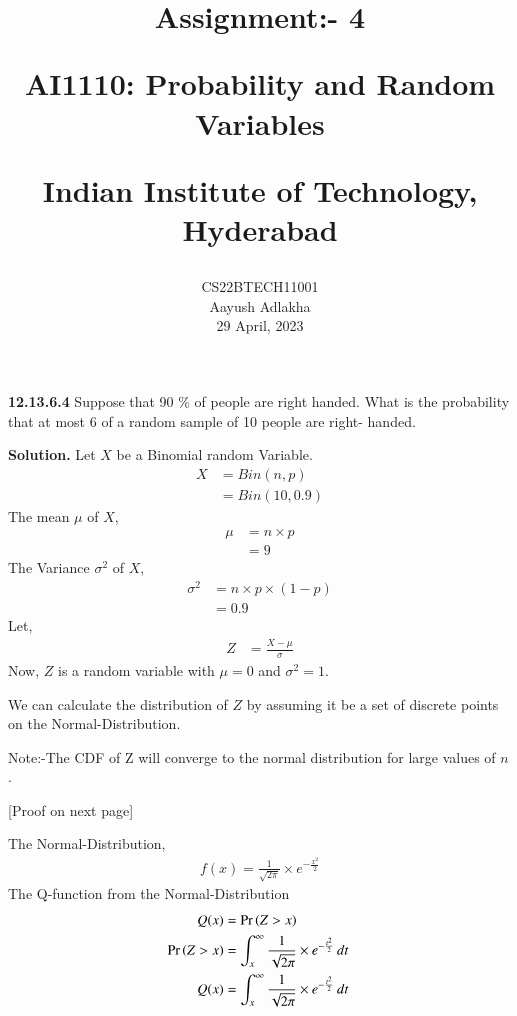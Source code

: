 \documentclass[journal,12pt,twocolumn]{IEEEtran}
\begin{document}
\let\vec\mathbf


\vspace{3cm}

\title{
	Assignment:- 4
 
	\Large AI1110: Probability and Random Variables
 
	\Large Indian Institute of Technology, Hyderabad
}
\author{
	CS22BTECH11001
	
	Aayush Adlakha
 
	29 April, 2023
}






\maketitle

\newpage


\bigskip
\renewcommand{\thefigure}{\theenumi}
\renewcommand{\thetable}{\theenumi}
\textbf{12.13.6.4}
Suppose that 90 \% of people are right handed. What is the probability that
at most 6 of a random sample of 10 people are right-
handed.

\textbf{Solution.}
Let $X$ be a Binomial random Variable.
\begin{align}
    X&=Bin(n,p)\\
    &=Bin(10,0.9)
\end{align}
The mean $\mu$ of $X$,
\begin{align}
    \mu &= n\times p\\
    &= 9
\end{align}
The Variance $\sigma^2$ of $X$,
\begin{align}
    \sigma^2 &= n\times p\times (1-p)\\
    &= 0.9
\end{align}
Let,
\begin{align}
    Z&=\frac{X-\mu}{\sigma}
\end{align}
Now, $Z$ is a random variable with $\mu=0$ and $\sigma^2=1$.

We can calculate the distribution of $Z$ by assuming it be a set of discrete points on the Normal-Distribution.

Note:-The CDF of Z will converge to the normal distribution for large values of $n$.

[Proof on next page]

The Normal-Distribution,
\begin{align}
    f(x) = \frac{1}{\sqrt{2\pi}}\times e^{-\frac{x^2}{2}}
\end{align}
The Q-function from the Normal-Distribution
\begin{align}
    Q(x) &=\Pr\left(Z>x\right)\\
    \Pr\left(Z>x\right)&=\int_{x}^{\infty} \frac{1}{\sqrt{2\pi}}\times e^{-\frac{t^2}{2}} \,dt\\\
    Q(x)&=\int_{x}^{\infty} \frac{1}{\sqrt{2\pi}}\times e^{-\frac{t^2}{2}} \,dt\
\end{align}
\end{document}
